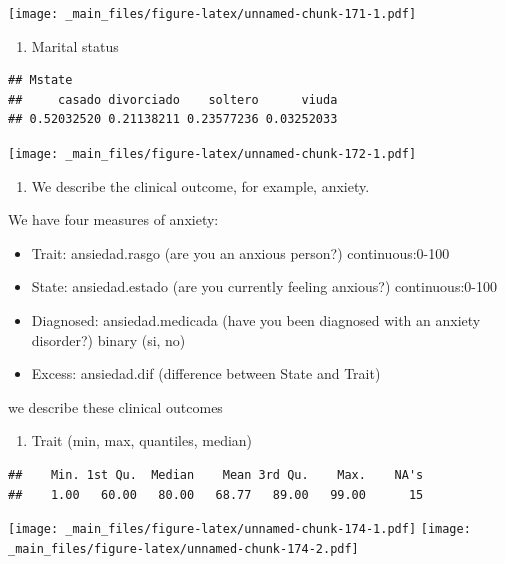 \documentclass[
]{book}
\providecommand{\tightlist}{%
  \setlength{\itemsep}{0pt}\setlength{\parskip}{0pt}}
\begin{document}
\texttt{[image: \_main\_files/figure-latex/unnamed-chunk-171-1.pdf]}

\begin{enumerate}
\def\labelenumi{\alph{enumi}.}
\setcounter{enumi}{3}
\tightlist
\item
  Marital status
\end{enumerate}

\begin{verbatim}
## Mstate
##     casado divorciado    soltero      viuda 
## 0.52032520 0.21138211 0.23577236 0.03252033
\end{verbatim}

\texttt{[image: \_main\_files/figure-latex/unnamed-chunk-172-1.pdf]}

\begin{enumerate}
\def\labelenumi{\arabic{enumi}.}
\setcounter{enumi}{1}
\tightlist
\item
  We describe the clinical outcome, for example, anxiety.
\end{enumerate}

We have four measures of anxiety:

\begin{itemize}
\tightlist
\item
  Trait: ansiedad.rasgo (are you an anxious person?) continuous:0-100
\item
  State: ansiedad.estado (are you currently feeling anxious?) continuous:0-100
\item
  Diagnosed: ansiedad.medicada (have you been diagnosed with an anxiety disorder?) binary (si, no)
\item
  Excess: ansiedad.dif (difference between State and Trait)
\end{itemize}

we describe these clinical outcomes

\begin{enumerate}
\def\labelenumi{\alph{enumi}.}
\tightlist
\item
  Trait (min, max, quantiles, median)
\end{enumerate}

\begin{verbatim}
##    Min. 1st Qu.  Median    Mean 3rd Qu.    Max.    NA's 
##    1.00   60.00   80.00   68.77   89.00   99.00      15
\end{verbatim}

\texttt{[image: \_main\_files/figure-latex/unnamed-chunk-174-1.pdf]} \texttt{[image: \_main\_files/figure-latex/unnamed-chunk-174-2.pdf]}
\end{document}
